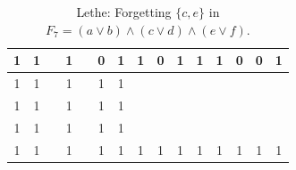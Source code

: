 \begin{table}[!tb]
\begin{tabular}{|c|c|c|c|c|c|c|c|c|c|c|c|c|c|c|}
        \rowcolor{yellow!40} 1 & 1 &  & 1 &  & 0 & 1 & 1 & 0 & 1 & 1 & 1 & 0 & 0 & 1 \\ \hline
        \rowcolor{gray!40} 1 & 1 &  & 1 &  & 1 & 1 &  &  &  &  &  &  &  &  \\ \hline
        \rowcolor{gray!40} 1 & 1 &  & 1 &  & 1 & 1 &  &  &  &  &  &  &  &  \\ \hline
        \rowcolor{gray!40} 1 & 1 &  & 1 &  & 1 & 1 &  &  &  &  &  &  &  &  \\ \hline
        \rowcolor{gray!40} 1 & 1 &  & 1 &  & 1 & 1 & 1 & 1 & 1 & 1 & 1 & 1 & 1 & 1 \\ \hline
    \end{tabular}
    \caption{Lethe: Forgetting $\{c, e\}$ in $F_{7} = (a \lor b) \land (c \lor d) \land (e \lor f)$.}
    \label{tab:lethe-F7-ce}
\end{table}
